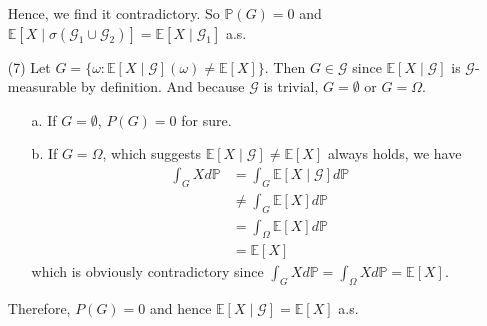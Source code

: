 \begin{enumerate}
    Hence, we find it contradictory. So $\mathbb{P}(G) = 0$ and $\mathbb{E}\left[X \mid \sigma\left(\mathcal{G}_{1} \cup \mathcal{G}_{2}\right)\right] = \mathbb{E}\left[X \mid \mathcal{G}_{1}\right]$ a.s.

    \item[(7)] Let $G = \{\omega: \mathbb{E}[X \mid \mathcal{G}] (\omega) \neq \mathbb{E}[X] \}$.
    Then $G \in \mathcal{G}$ since $\mathbb{E}[X \mid \mathcal{G}]$ is $\mathcal{G}$-measurable by definition.
    And because $\mathcal{G}$ is trivial, $G = \emptyset$ or $G = \Omega$.
    \begin{enumerate}
        \item[a.] If $G = \emptyset$, $P(G) = 0$ for sure.
        \item[b.] If $G = \Omega$, which suggests $\mathbb{E}[X \mid \mathcal{G}] \neq \mathbb{E}[X]$ always holds, we have
        \begin{equation}
            \begin{split}
                \int_{G} X d \mathbb{P}
                &= \int_{G} \mathbb{E}[X \mid \mathcal{G}] d \mathbb{P} \\
                &\neq \int_{G} \mathbb{E}[X] d \mathbb{P} \\
                &= \int_{\Omega} \mathbb{E}[X] d \mathbb{P} \\
                &= \mathbb{E}[X]
            \end{split}
        \end{equation}
        which is obviously contradictory since $\int_{G} X d \mathbb{P} = \int_{\Omega} X d \mathbb{P} = \mathbb{E}[X]$.
    \end{enumerate}
    Therefore, $P(G) = 0$ and hence $\mathbb{E}[X \mid \mathcal{G}] = \mathbb{E}[X]$ a.s.
\end{enumerate}